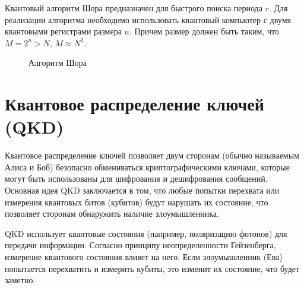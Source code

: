\documentclass[12pt]{article}
\begin{document}
Квантовый алгоритм Шора предназначен для быстрого поиска периода \( r \). Для реализации алгоритма необходимо использовать квантовый компьютер с двумя квантовыми регистрами размера \( n \). Причем размер должен быть таким, что \( M = 2^n > N \), \( M \approx N^2 \).

\begin{figure}[h]
    \centering
    \begin{algorithm}[H]
    \caption{Алгоритм Шора для факторизации числа \( N \)}
     
    \end{algorithm}
    \caption{Алгоритм Шора}
    \label{fig:post-mechs}
\end{figure}


\section{Квантовое распределение ключей (QKD)}

Квантовое распределение ключей позволяет двум сторонам (обычно называемым Алиса и Боб) безопасно обмениваться криптографическими ключами, которые могут быть использованы для шифрования и дешифрования сообщений. Основная идея QKD заключается в том, что любые попытки перехвата или измерения квантовых битов (кубитов) будут нарушать их состояние, что позволяет сторонам обнаружить наличие злоумышленника.

QKD использует квантовые состояния (например, поляризацию фотонов) для передачи информации. Согласно принципу неопределенности Гейзенберга, измерение квантового состояния влияет на него. Если злоумышленник (Ева) попытается перехватить и измерить кубиты, это изменит их состояние, что будет заметно.
\end{document}
